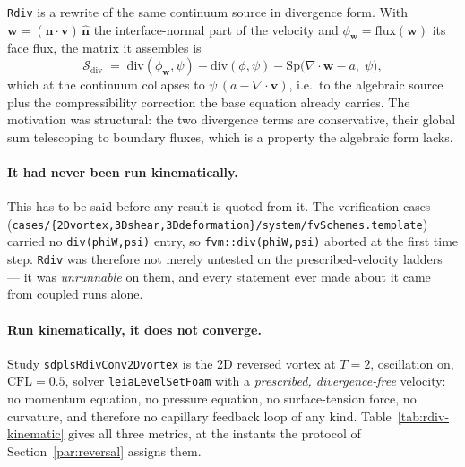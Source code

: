 \documentclass[preprint,3p,11pt]{elsarticle}
\newcommand{\psilev}{\psi}
\newcommand{\nhat}{\hat{\mathbf{n}}}
\begin{document}
\texttt{Rdiv} is a rewrite of the same continuum source in divergence form. With
$\mathbf{w} = (\nhat\cdot\mathbf{v})\,\nhat$ the interface-normal part of the
velocity and $\phi_{\mathbf{w}} = \mathrm{flux}(\mathbf{w})$ its face flux, the
matrix it assembles is
\begin{equation}
  \mathcal{S}_{\mathrm{div}} \;=\;
    \mathrm{div}(\phi_{\mathbf{w}}, \psilev)
  - \mathrm{div}(\phi, \psilev)
  - \mathrm{Sp}\bigl(\nabla\cdot\mathbf{w} - a,\; \psilev\bigr),
  \label{eq:rdivassembly}
\end{equation}
which at the continuum collapses to $\psilev\,(a - \nabla\cdot\mathbf{v})$, i.e.\
to the algebraic source plus the compressibility correction the base equation
already carries. The motivation was structural: the two divergence terms are
conservative, their global sum telescoping to boundary fluxes, which is a
property the algebraic form lacks.

\paragraph{It had never been run kinematically.} This has to be said before any
result is quoted from it. The verification cases
(\texttt{cases/\{2Dvortex,3Dshear,3Ddeformation\}/system/fvSchemes.template})
carried no \texttt{div(phiW,psi)} entry, so \texttt{fvm::div(phiW,psi)} aborted
at the first time step. \texttt{Rdiv} was therefore not merely untested on the
prescribed-velocity ladders --- it was \emph{unrunnable} on them, and every
statement ever made about it came from coupled runs alone.

\paragraph{Run kinematically, it does not converge.} Study
\texttt{sdplsRdivConv2Dvortex} is the 2D reversed vortex at $T=2$, oscillation
on, $\mathrm{CFL}=0.5$, solver \texttt{leiaLevelSetFoam} with a
\emph{prescribed, divergence-free} velocity: no momentum equation, no pressure
equation, no surface-tension force, no curvature, and therefore no capillary
feedback loop of any kind. Table~\ref{tab:rdiv-kinematic} gives all three
metrics, at the instants the protocol of Section~\ref{par:reversal} assigns them.
\end{document}
